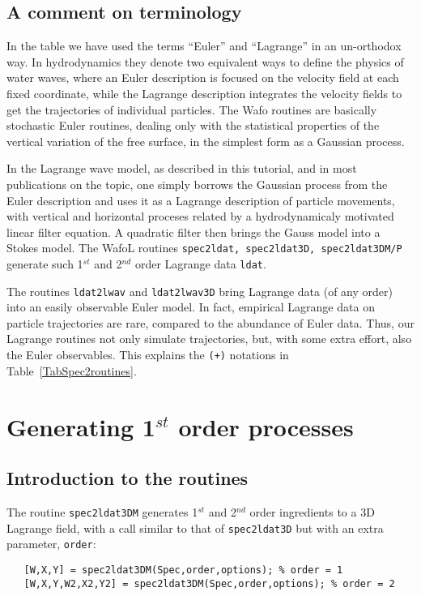 \subsection{A comment on terminology}
In the table we have used the terms ``Euler'' and ``Lagrange'' in an un-orthodox way. In hydrodynamics they denote two equivalent ways to define the physics of water waves, 
where an Euler description is focused on the velocity field at each fixed coordinate, 
while the Lagrange description integrates the velocity fields to get the trajectories of
 individual particles. The {\sc Wafo} routines are basically stochastic Euler routines, 
dealing only with the statistical properties of the vertical variation of the free surface,  in the simplest form  as a Gaussian process.

In the Lagrange wave model, as described in this tutorial, and in most publications on the topic, one simply borrows the Gaussian process from the Euler description and uses it as a Lagrange description of particle movements, with vertical and horizontal proceses related by a hydrodynamicaly motivated linear filter equation.  A quadratic filter then brings the Gauss model into a Stokes model. The {\sc Wafo}L routines {\tt spec2ldat, spec2ldat3D, spec2ldat3DM/P}  generate such 1$^{st}$ and 2$^{nd}$ order Lagrange data {\tt ldat}. 

The routines {\tt ldat2lwav} and {\tt ldat2lwav3D} bring Lagrange data (of any order) into an easily observable Euler model. In fact, empirical Lagrange data on particle trajectories are rare, compared to the abundance of Euler data.  Thus, our Lagrange routines not only simulate trajectories, but, with some extra effort, also the Euler observables.  This explains the {\tt (+)} notations in 
Table~\ref{TabSpec2routines}.


\section{Generating 1$^{st}$ order processes} %
\subsection{Introduction to the routines}
The routine {\tt spec2ldat3DM} generates 1$^{st}$ and 2$^{nd}$ order 
ingredients to a 3D Lagrange field, with a call similar to that of {\tt spec2ldat3D} but with an extra parameter, {\tt order}:  
{\small\begin{verbatim}
   [W,X,Y] = spec2ldat3DM(Spec,order,options); % order = 1  
   [W,X,Y,W2,X2,Y2] = spec2ldat3DM(Spec,order,options); % order = 2
\end{verbatim}
}

